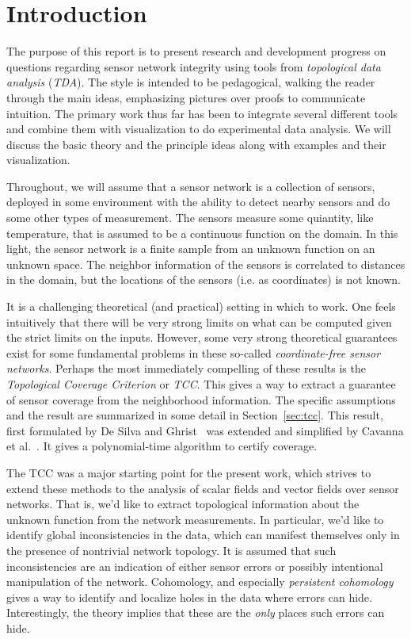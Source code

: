 \section{Introduction} %
\label{sec:introduction}

  The purpose of this report is to present research and development progress on questions regarding sensor network integrity using tools from \emph{topological data analysis} (\emph{TDA}).
  The style is intended to be pedagogical, walking the reader through the main ideas, emphasizing pictures over proofs to communicate intuition.
  The primary work thus far has been to integrate several different tools and combine them with visualization to do experimental data analysis.
  We will discuss the basic theory and the principle ideas along with examples and their visualization.

  Throughout, we will assume that a sensor network is a collection of sensors, deployed in some environment with the ability to detect nearby sensors and do some other types of measurement.
  The sensors measure some quiantity, like temperature, that is assumed to be a continuous function on the domain.
  In this light, the sensor network is a finite sample from an unknown function on an unknown space.
  The neighbor information of the sensors is correlated to distances in the domain, but the locations of the sensors (i.e. as coordinates) is not known.

  It is a challenging theoretical (and practical) setting in which to work.
  One feels intuitively that there will be very strong limits on what can be computed given the strict limits on the inputs.
  However, some very strong theoretical guarantees exist for some fundamental problems in these so-called \emph{coordinate-free sensor networks}.
  Perhaps the most immediately compelling of these results is the \emph{Topological Coverage Criterion} or \emph{TCC}.
  This gives a way to extract a guarantee of sensor coverage from the neighborhood information.
  The specific assumptions and the result are summarized in some detail in Section~\ref{sec:tcc}.
  This result, first formulated by De Silva and Ghrist~\cite{desilva07coverage} was extended and simplified by Cavanna et al.~\cite{cavanna17when}.
  It gives a polynomial-time algorithm to certify coverage.

  The TCC was a major starting point for the present work, which strives to extend these methods to the analysis of scalar fields and vector fields over sensor networks.
  That is, we'd like to extract topological information about the unknown function from the network measurements.
  In particular, we'd like to identify global inconsistencies in the data, which can manifest themselves only in the presence of nontrivial network topology.
  It is assumed that such inconsistencies are an indication of either sensor errors or possibly intentional manipulation of the network.
  Cohomology, and especially \emph{persistent cohomology} gives a way to identify and localize holes in the data where errors can hide.
  Interestingly, the theory implies that these are the \emph{only} places such errors can hide.


